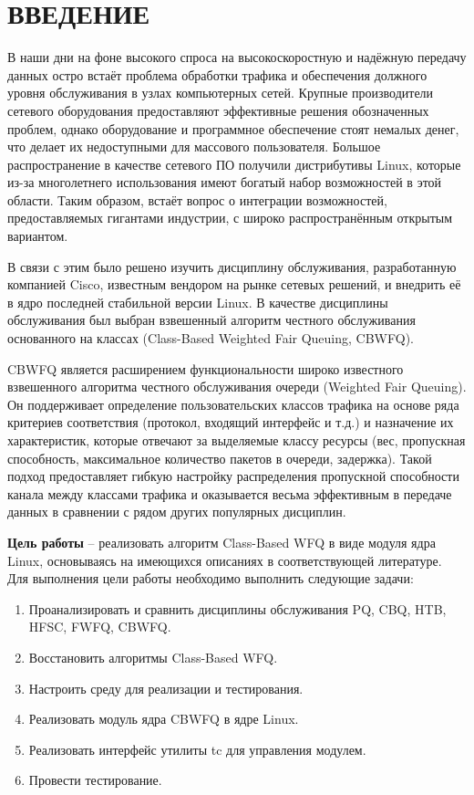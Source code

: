 \section*{ВВЕДЕНИЕ}

В наши дни на фоне высокого спроса на высокоскоростную и надёжную передачу данных
остро встаёт проблема обработки трафика и обеспечения должного уровня обслуживания
в узлах компьютерных сетей. Крупные производители сетевого оборудования
предоставляют эффективные решения обозначенных проблем, однако оборудование и программное
обеспечение стоят немалых денег, что делает их недоступными для массового пользователя.
Большое распространение в качестве сетевого ПО получили дистрибутивы Linux,
которые из-за многолетнего использования имеют богатый набор возможностей в этой области.
Таким образом, встаёт вопрос о интеграции возможностей,
предоставляемых гигантами индустрии, с широко распространённым открытым вариантом.

В связи с этим было решено изучить дисциплину обслуживания, разработанную компанией Cisco,
известным вендором на рынке сетевых решений, и внедрить её в ядро последней стабильной версии Linux. 
В качестве дисциплины обслуживания был выбран взвешенный алгоритм честного
обслуживания основанного на классах (Class-Based Weighted Fair Queuing, CBWFQ).

CBWFQ является расширением функциональности широко известного взвешенного алгоритма
честного обслуживания очереди (Weighted Fair Queuing). Он поддерживает
определение пользовательских классов трафика на основе ряда критериев соответствия
(протокол, входящий интерфейс и т.д.) и назначение их характеристик, которые
отвечают за выделяемые классу ресурсы (вес, пропускная способность, максимальное
количество пакетов в очереди, задержка). Такой подход предоставляет гибкую настройку
распределения пропускной способности канала между классами трафика и оказывается весьма
эффективным в передаче данных в сравнении с рядом других популярных дисциплин.\cite{thesis}

\textbf{Цель работы} -- реализовать алгоритм Class-Based WFQ в виде модуля ядра Linux, основываясь на имеющихся
описаниях в соответствующей литературе. 
Для выполнения цели работы необходимо выполнить следующие задачи:
\begin{enumerate}
    \item Проанализировать и сравнить дисциплины обслуживания PQ, CBQ, HTB, HFSC, FWFQ, CBWFQ.
    \item Восстановить алгоритмы Class-Based WFQ.
    \item Настроить среду для реализации и тестирования.
    \item Реализовать модуль ядра CBWFQ в ядре Linux.
    \item Реализовать интерфейс утилиты tc для управления модулем.
    \item Провести тестирование.
\end{enumerate}

